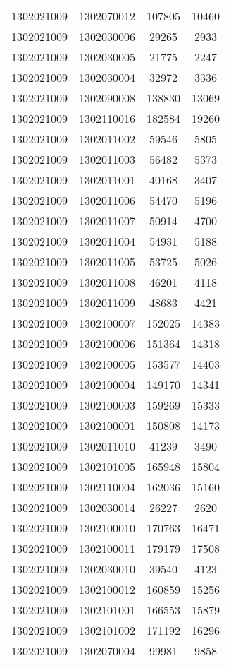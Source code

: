 \begin{longtable}{llcc}
1302021009 & 1302070012 & 107805 & 10460\\
1302021009 & 1302030006 & 29265 & 2933\\
1302021009 & 1302030005 & 21775 & 2247\\
1302021009 & 1302030004 & 32972 & 3336\\
1302021009 & 1302090008 & 138830 & 13069\\
1302021009 & 1302110016 & 182584 & 19260\\
1302021009 & 1302011002 & 59546 & 5805\\
1302021009 & 1302011003 & 56482 & 5373\\
1302021009 & 1302011001 & 40168 & 3407\\
1302021009 & 1302011006 & 54470 & 5196\\
1302021009 & 1302011007 & 50914 & 4700\\
1302021009 & 1302011004 & 54931 & 5188\\
1302021009 & 1302011005 & 53725 & 5026\\
1302021009 & 1302011008 & 46201 & 4118\\
1302021009 & 1302011009 & 48683 & 4421\\
1302021009 & 1302100007 & 152025 & 14383\\
1302021009 & 1302100006 & 151364 & 14318\\
1302021009 & 1302100005 & 153577 & 14403\\
1302021009 & 1302100004 & 149170 & 14341\\
1302021009 & 1302100003 & 159269 & 15333\\
1302021009 & 1302100001 & 150808 & 14173\\
1302021009 & 1302011010 & 41239 & 3490\\
1302021009 & 1302101005 & 165948 & 15804\\
1302021009 & 1302110004 & 162036 & 15160\\
1302021009 & 1302030014 & 26227 & 2620\\
1302021009 & 1302100010 & 170763 & 16471\\
1302021009 & 1302100011 & 179179 & 17508\\
1302021009 & 1302030010 & 39540 & 4123\\
1302021009 & 1302100012 & 160859 & 15256\\
1302021009 & 1302101001 & 166553 & 15879\\
1302021009 & 1302101002 & 171192 & 16296\\
1302021009 & 1302070004 & 99981 & 9858\\

\end{longtable}
